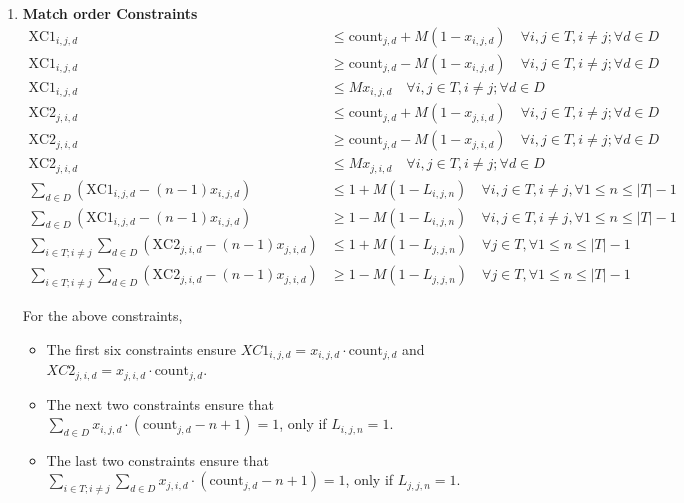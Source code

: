 \documentclass[a4paper, 12pt]{article}
\begin{document}
\begin{enumerate}
    \item \textbf{Match order Constraints}
    \begin{align*}
        \text{XC1}_{i,j,d} &\leq \text{count}_{j,d} + M(1 - x_{i,j,d}) \quad \forall i,j \in T, i \neq j ; \forall d \in D\\
        \text{XC1}_{i,j,d} &\geq \text{count}_{j,d} - M(1 - x_{i,j,d}) \quad \forall i,j \in T, i \neq j ; \forall d \in D\\
        \text{XC1}_{i,j,d} &\leq M x_{i,j,d} \quad \forall i,j \in T, i \neq j ; \forall d \in D\\
        \text{XC2}_{j,i,d} &\leq \text{count}_{j,d} + M(1 - x_{j,i,d}) \quad \forall i,j \in T, i \neq j ; \forall d \in D\\
        \text{XC2}_{j,i,d} &\geq \text{count}_{j,d} - M(1 - x_{j,i,d}) \quad \forall i,j \in T, i \neq j ; \forall d \in D\\
        \text{XC2}_{j,i,d} &\leq M x_{j,i,d} \quad \forall i,j \in T, i \neq j ; \forall d \in D\\
        \sum_{d \in D} (\text{XC1}_{i,j,d} - (n-1)x_{i,j,d}) &\leq 1 +  M(1 - L_{i,j,n}) \quad \forall i,j \in T, i \neq j, \forall 1 \leq n \leq |T| - 1\\
        \sum_{d \in D} (\text{XC1}_{i,j,d} - (n-1)x_{i,j,d}) &\geq 1 - M(1 - L_{i,j,n}) \quad \forall i,j \in T, i \neq j, \forall 1 \leq n \leq |T| - 1\\
        \sum_{i \in T; i \neq j} \sum_{d \in D} (\text{XC2}_{j,i,d} - (n-1)x_{j,i,d}) &\leq 1 + M(1 - L_{j,j,n}) \quad \forall j \in T,\forall 1 \leq n \leq |T| - 1\\
        \sum_{i \in T; i \neq j} \sum_{d \in D} (\text{XC2}_{j,i,d} - (n-1)x_{j,i,d}) &\geq 1 - M(1 - L_{j,j,n}) \quad \forall j \in T,\forall 1 \leq n \leq |T| - 1
    \end{align*}

    For the above constraints,
    \begin{itemize}
        \item The first six constraints ensure $XC1_{i,j,d} = x_{i,j,d}\cdot \text{count}_{j,d}$ and $XC2_{j,i,d} = x_{j,i,d}\cdot \text{count}_{j,d}$.
        \item The next two constraints ensure that $\sum_{d \in D} x_{i,j,d}\cdot(\text{count}_{j,d} - n + 1) = 1$, only if $L_{i,j,n} = 1$.
        \item  The last two constraints ensure that $\sum_{i \in T; i \neq j}\sum_{d \in D} x_{j,i,d}\cdot(\text{count}_{j,d} - n + 1) = 1$, only if $L_{j,j,n} = 1$.
    \end{itemize}


\end{enumerate}
\end{document}
